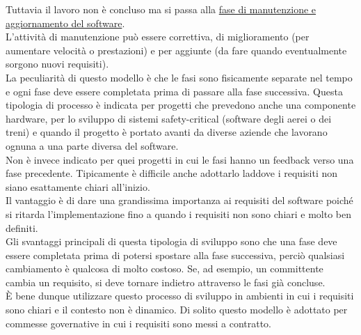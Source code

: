 Tuttavia il lavoro non è concluso ma si passa alla \underline{fase di manutenzione e aggiornamento del software}.\\
L'attività di manutenzione può essere correttiva, di miglioramento (per aumentare velocità o prestazioni) e per aggiunte (da fare quando eventualmente sorgono nuovi requisiti).\\
La peculiarità di questo modello è che le fasi sono fisicamente separate nel tempo e ogni fase deve essere completata prima di passare alla fase successiva.
Questa tipologia di processo è indicata per progetti che prevedono anche una componente hardware, per lo sviluppo di sistemi safety-critical (software degli aerei o dei treni) e quando il progetto è portato avanti da diverse aziende che lavorano ognuna a una parte diversa del software.\\
Non è invece indicato per quei progetti in cui le fasi hanno un feedback verso una fase precedente. Tipicamente è difficile anche adottarlo laddove i requisiti non siano esattamente chiari all'inizio.\\
Il vantaggio è di dare una grandissima importanza ai requisiti del software poiché si ritarda l'implementazione fino a quando i requisiti non sono chiari e molto ben definiti.\\
Gli svantaggi principali di questa tipologia di sviluppo sono che una fase deve essere completata prima di potersi spostare alla fase successiva, perciò qualsiasi cambiamento è qualcosa di molto costoso.
Se, ad esempio, un committente cambia un requisito, si deve tornare indietro attraverso le fasi già concluse.\\
È bene dunque utilizzare questo processo di sviluppo in ambienti in cui i requisiti sono chiari e il contesto non è dinamico.
Di solito questo modello è adottato per commesse governative in cui i requisiti sono messi a contratto.

